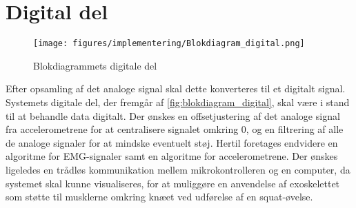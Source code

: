 \section{Digital del} \label{sec:digital_del_krav}
\begin{figure}[H]
\centering
\texttt{[image: figures/implementering/Blokdiagram\_digital.png]}
\caption{Blokdiagrammets digitale del}
\label{fig:blokdiagram_digital}
\end{figure}

\noindent
Efter opsamling af det analoge signal skal dette konverteres til et digitalt signal. Systemets digitale del, der fremgår af \autoref{fig:blokdiagram_digital}, skal være i stand til at behandle data digitalt. Der ønskes en offsetjustering af det analoge signal fra accelerometrene for at centralisere signalet omkring 0, og en filtrering af alle de analoge signaler for at mindske eventuelt støj. Hertil foretages endvidere en algoritme for EMG-signaler samt en algoritme for accelerometrene. Der ønskes ligeledes en trådløs kommunikation mellem mikrokontrolleren og en computer, da systemet skal kunne visualiseres, for at muliggøre en anvendelse af exoskelettet som støtte til musklerne omkring knæet ved udførelse af en squat-øvelse.
